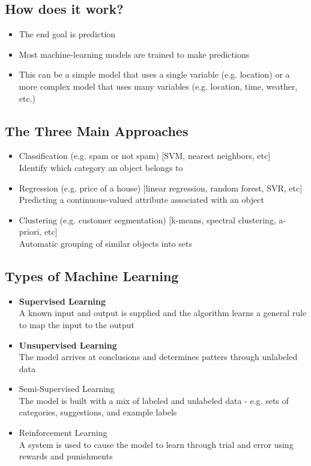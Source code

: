 \documentclass[12pt]{article}
\begin{document}
        \subsection{How does it work?}
            \begin{itemize}
                \item The end goal is prediction
                \item Most machine-learning models are trained to make predictions
                \item This can be a simple model that uses a single variable (e.g. location) or a more complex model that uses many variables (e.g. location, time, weather, etc.)
            \end{itemize}
        \subsection{The Three Main Approaches}
            \begin{itemize}
                \item Classification (e.g. spam or not spam) [SVM, nearest neighbors, etc]
                \\Identify which category an object belongs to
                \item Regression (e.g. price of a house) [linear regression, random forest, SVR, etc]
                \\Predicting a continuous-valued attribute associated with an object
                \item Clustering (e.g. customer segmentation) [k-means, spectral clustering, a-priori, etc]
                \\Automatic grouping of similar objects into sets
            \end{itemize}
        \subsection{Types of Machine Learning}
            \begin{itemize}
                \item \textbf{Supervised Learning}
                \\A known input and output is supplied and the algorithm learns a general rule to map the input to the output
                \item \textbf{Unsupervised Learning}
                \\The model arrives at conclusions and determines patters through unlabeled data
                \item Semi-Supervised Learning
                \\The model is built with a mix of labeled and unlabeled data - e.g. sets of categories, suggestions, and example labels
                \item Reinforcement Learning
                \\A system is used to cause the model to learn through trial and error using rewards and punishments
            \end{itemize}
\end{document}
